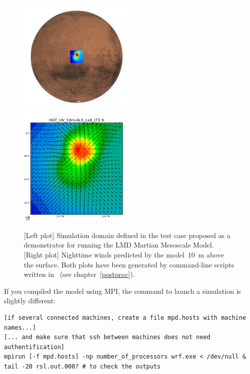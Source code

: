 \begin{center} 
\begin{figure}[h!]
\includegraphics[width=0.5\textwidth]{arsiadomain.png} 
\includegraphics[width=0.5\textwidth]{LMD_MMM_d1_20km_HGT_UV_10m-ALS_Ls8_LT1_100.png}
\caption{\label{arsia} [Left plot] Simulation domain defined in the test case proposed as a demonstrator for running the LMD Martian Mesoscale Model. [Right plot] Nighttime winds predicted by the model~$10$~m above the surface. Both plots have been generated by command-line scripts written in~ (see chapter~\ref{postproc}).}
\end{figure}
\end{center}

\bk
\begin{finger}
\item If you compiled the model using MPI, the command to launch a simulation is slightly different:
%
\begin{verbatim}
[if several connected machines, create a file mpd.hosts with machine names...]
[... and make sure that ssh between machines does not need authentification]
mpirun [-f mpd.hosts] -np number_of_processors wrf.exe < /dev/null &      
tail -20 rsl.out.000? # to check the outputs
\end{verbatim}
\end{finger}

\clearemptydoublepage
